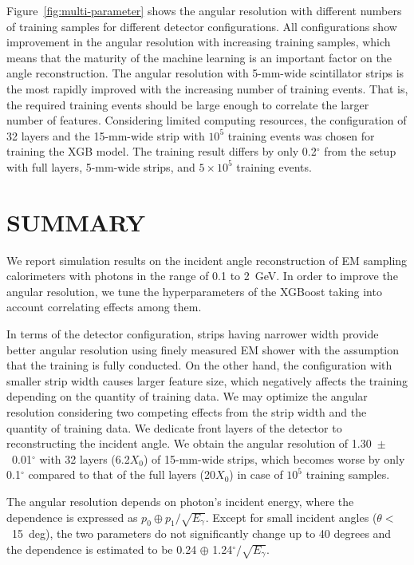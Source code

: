 \documentclass[preprint,12pt,times,a4paper]{elsarticle}
\begin{document}
Figure~\ref{fig:multi-parameter} shows the angular resolution with different numbers of training samples for different detector configurations. All configurations show improvement in the angular resolution with increasing training samples, which means that the maturity of the machine learning is an important factor on the angle reconstruction. The angular resolution with 5-mm-wide scintillator strips is the most rapidly improved with the increasing number of training events. That is, the required training events should be large enough to correlate the larger number of features. Considering limited computing resources, the configuration of 32 layers and the 15-mm-wide strip with $10^{5}$ training events was chosen for training the XGB model. The training result differs by only 0.2$^{\circ}$ from the setup with full layers, 5-mm-wide strips, and $5\times10^{5}$ training events.
 
\section{SUMMARY}
\label{sec:sum}

We report simulation results on the incident angle reconstruction of EM sampling calorimeters with photons in the range of 0.1 to 2~GeV. In order to improve the angular resolution, we tune the hyperparameters of the XGBoost taking into account correlating effects among them.

In terms of the detector configuration, strips having narrower width provide better angular resolution using finely measured EM shower with the assumption that the training is fully conducted. On the other hand, the configuration with smaller strip width causes larger feature size, which negatively affects the training depending on the quantity of training data. We may optimize the angular resolution considering two competing effects from the strip width and the quantity of training data. We dedicate front layers of the detector to reconstructing the incident angle. We obtain the angular resolution of 1.30~$\pm$~0.01$^{\circ}$ with 32 layers (6.2$X_{0}$) of 15-mm-wide strips, which becomes worse by only 0.1$^{\circ}$ compared to that of the full layers (20$X_{0}$) in case of $10^{5}$ training samples. 

The angular resolution depends on photon’s incident energy, where the dependence is expressed as $p_{0} \oplus p_{1}/\sqrt{E_{\gamma}}$. Except for small incident angles ($\theta<$~15~deg), the two parameters do not significantly change up to 40 degrees and the dependence is estimated to be 0.24 $\oplus$ 1.24$^{\circ}/\sqrt{E_{\gamma}}$. 
\end{document}
